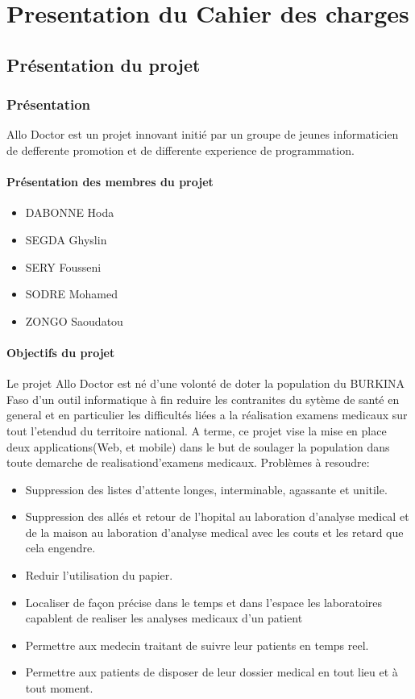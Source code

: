 \documentclass{report}
\begin{document}
   
\part{Presentation du Cahier des charges}
\chapter{Présentation du projet}
\section{Présentation}
Allo Doctor est un projet innovant initié par un groupe de jeunes informaticien de defferente promotion et de differente experience de programmation. 
\subsection{Présentation des membres du projet}
\begin{itemize}
\item DABONNE Hoda
\item SEGDA Ghyslin
\item SERY Fousseni
\item SODRE Mohamed
\item ZONGO Saoudatou
\end{itemize}
\subsection{Objectifs du projet}
Le projet Allo Doctor est né d'une volonté de doter la population du BURKINA Faso d'un outil informatique à fin reduire les contranites 
du sytème de santé en general et en particulier les difficultés liées a la réalisation examens medicaux sur tout l'etendud du territoire national.
 A terme, ce projet vise la 
mise en place deux applications(Web, et mobile) dans le but de soulager la population dans toute demarche de realisationd'examens medicaux. Problèmes à resoudre:
\begin{itemize}
    \item Suppression des listes d'attente longes,
     interminable, agassante et unitile.
    \item Suppression des allés et retour de l'hopital 
    au laboration d'analyse medical et de la maison 
    au laboration d'analyse medical avec les couts et les retard que cela engendre.
    \item Reduir l'utilisation du papier.
    \item Localiser de façon précise dans le temps et dans l'espace les laboratoires capablent de realiser les analyses medicaux d'un patient
    \item Permettre aux medecin traitant de suivre leur patients en temps reel.
    \item Permettre aux patients de disposer de leur dossier medical en tout lieu et à tout moment.
\end{itemize}    
\end{document}
